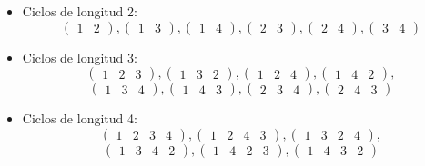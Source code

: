 \documentclass[11pt,a4paper]{article}
\begin{document}
\begin{itemize}
\item Ciclos de longitud 2:
\begin{equation*}
\begin{pmatrix}
1 & 2
\end{pmatrix}
,
\begin{pmatrix}
1 & 3
\end{pmatrix}
,
\begin{pmatrix}
1 & 4
\end{pmatrix}
,
\begin{pmatrix}
2 & 3
\end{pmatrix}
,
\begin{pmatrix}
2 & 4
\end{pmatrix}
,
\begin{pmatrix}
3 & 4
\end{pmatrix}
\end{equation*}
\item Ciclos de longitud 3:
\begin{equation*}
\begin{pmatrix}
1 & 2 & 3
\end{pmatrix}
,
\begin{pmatrix}
1 & 3 & 2
\end{pmatrix}
,
\begin{pmatrix}
1 & 2 & 4
\end{pmatrix}
,
\begin{pmatrix}
1 & 4 & 2
\end{pmatrix}
,
\end{equation*}
\begin{equation*}
\begin{pmatrix}
1 & 3 & 4
\end{pmatrix}
,
\begin{pmatrix}
1 & 4 & 3
\end{pmatrix}
,
\begin{pmatrix}
2 & 3 & 4
\end{pmatrix}
,
\begin{pmatrix}
2 & 4 & 3
\end{pmatrix}
\end{equation*}

\item Ciclos de longitud 4:
\begin{equation*}
\begin{pmatrix}
1 & 2 & 3 & 4
\end{pmatrix}
,
\begin{pmatrix}
1 & 2 & 4 & 3
\end{pmatrix}
,
\begin{pmatrix}
1 & 3 & 2 & 4
\end{pmatrix}
,
\end{equation*}
\begin{equation*}
\begin{pmatrix}
1 & 3 & 4 & 2
\end{pmatrix}
,
\begin{pmatrix}
1 & 4 & 2 & 3
\end{pmatrix}
,
\begin{pmatrix}
1 & 4 & 3 & 2
\end{pmatrix}
\end{equation*}


\end{itemize}
\end{document}
